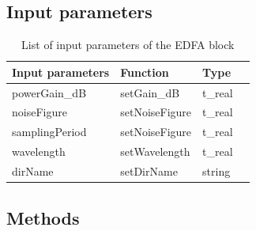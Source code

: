 \subsection*{Input parameters}

%
\begin{table}[h]
	\begin{center}
		\begin{tabular}{| m{} | m{} |  m{} | m{4cm} | }
			\hline
			\textbf{Input parameters} & \textbf{Function} & \textbf{Type} \\\hline
			powerGain\_dB             & setGain\_dB       & t\_real       \\\hline
			noiseFigure               & setNoiseFigure    & t\_real       \\\hline
			samplingPeriod            & setNoiseFigure    & t\_real       \\\hline
			wavelength                & setWavelength     & t\_real       \\\hline
			dirName                   & setDirName        & string        \\\hline
		\end{tabular}
		\caption{List of input parameters of the EDFA block} \label{table}
	\end{center}
\end{table}
%
\pagebreak

\subsection*{Methods}

